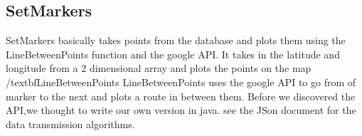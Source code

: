 \documentclass{project}
\begin{document}
\subsection{SetMarkers}
SetMarkers basically takes points from the database and plots them using the LineBetweenPoints function and the google API. It takes in the latitude and longitude from a 2 dimensional array and plots the points on the map
/textbf{LineBetweenPoints}
LineBetweenPoints uses the google API to go from of marker to the next and plots a route in between them. Before we discovered the API,we thought to write our own version in java. 
see the JSon document for the data transmission algorithms.

\end{document}
